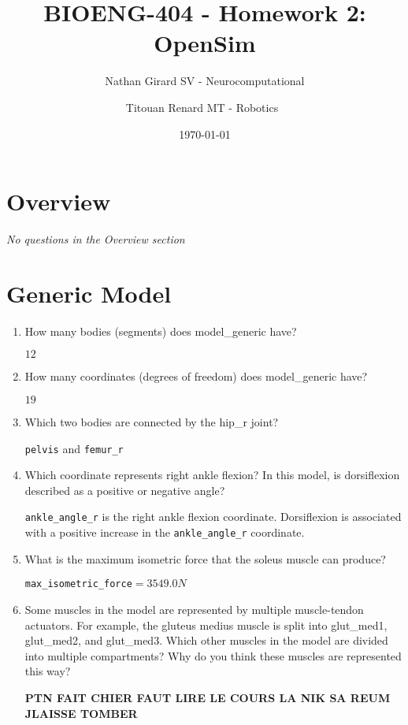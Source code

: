 \documentclass[11pt]{article}
\title{BIOENG-404 - Homework 2: OpenSim}
\author{
    Nathan Girard
        SV - Neurocomputational
        \and
    Titouan Renard
            MT - Robotics 
}
\date{\today}
\begin{document}
\maketitle

\section{Overview}
\begin{adjustwidth}{0.5cm}{}
    \textit{No questions in the Overview section}
\end{adjustwidth}
\section{Generic Model}

\begin{enumerate}
    \item How many bodies (segments) does model\_generic have?
    \begin{adjustwidth}{0.5cm}{}
        $12$
    \end{adjustwidth}
    \item How many coordinates (degrees of freedom) does model\_generic have?
    \begin{adjustwidth}{0.5cm}{}
        $19$
    \end{adjustwidth}
    \item Which two bodies are connected by the hip\_r joint?
    \begin{adjustwidth}{0.5cm}{}
        \texttt{pelvis} and \texttt{femur\_r}
    \end{adjustwidth}
    \item Which coordinate represents right ankle flexion? In this model, is dorsiflexion described as a positive or negative angle?
    \begin{adjustwidth}{0.5cm}{}
        \texttt{ankle\_angle\_r} is the right ankle flexion coordinate. Dorsiflexion is associated with a positive increase in the \texttt{ankle\_angle\_r} coordinate.
    \end{adjustwidth}
    \item What is the maximum isometric force that the soleus muscle can produce?
    \begin{adjustwidth}{0.5cm}{}
        \texttt{max\_isometric\_force}$=3549.0N$
    \end{adjustwidth}
    \item Some muscles in the model are represented by multiple muscle-tendon actuators. For example, the gluteus medius muscle is split into glut\_med1, glut\_med2, and glut\_med3. Which other muscles in the model are divided into multiple compartments? Why do you think these muscles are represented this way?
    \begin{adjustwidth}{0.5cm}{}
        \textbf{PTN FAIT CHIER FAUT LIRE LE COURS LA NIK SA REUM JLAISSE TOMBER}
    \end{adjustwidth}
\end{enumerate}
\end{document}
